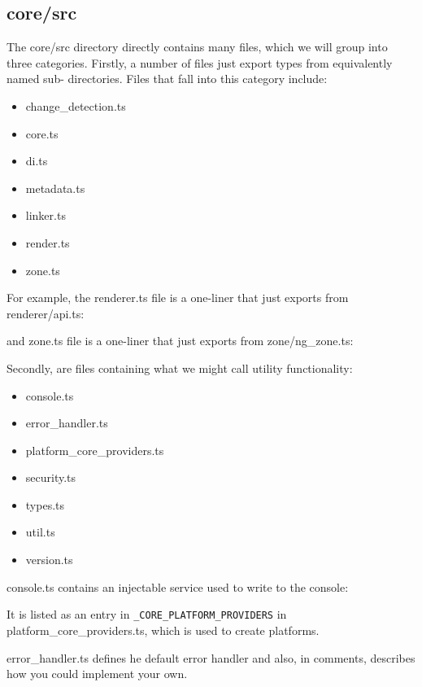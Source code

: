 \subsection{core/src}

The core/src directory directly contains many files, which we will group into three
categories. Firstly, a number of files just export types from equivalently named sub-
directories. Files that fall into this category include:

\begin{itemize}
  \item change\_detection.ts
  \item core.ts
  \item di.ts
  \item metadata.ts
  \item linker.ts
  \item render.ts
  \item zone.ts
\end{itemize}

For example, the renderer.ts file is a one-liner that just exports from renderer/api.ts:



and zone.ts file is a one-liner that just exports from zone/ng\_zone.ts:



Secondly, are files containing what we might call utility functionality:

\begin{itemize}
  \item console.ts
  \item error\_handler.ts
  \item platform\_core\_providers.ts
  \item security.ts
  \item types.ts
  \item util.ts
  \item version.ts
\end{itemize}

console.ts contains an injectable service used to write to the console:



It is listed as an entry in
\texttt{\_CORE\_PLATFORM\_PROVIDERS}
in platform\_core\_providers.ts,
which is used to create platforms.

error\_handler.ts defines he default error handler and also, in comments, describes
how you could implement your own.

